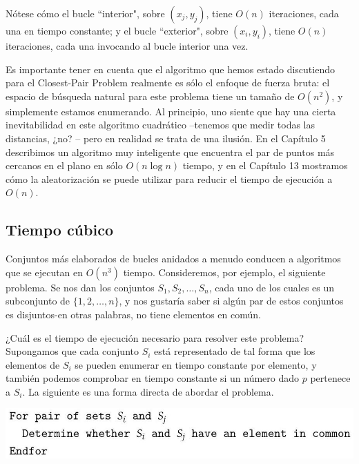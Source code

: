 \documentclass[a4paper, 12pt]{book}
\theoremstyle{dotless}
\begin{document}
Nótese cómo el bucle ``interior", sobre $\left(x_{j}, y_{j}\right)$, tiene $O(n)$ iteraciones, cada una en tiempo constante; y el bucle ``exterior", sobre $\left(x_{i}, y_{i}\right)$, tiene $O(n)$ iteraciones, cada una invocando al bucle interior una vez.

Es importante tener en cuenta que el algoritmo que hemos estado discutiendo para el Closest-Pair Problem realmente es sólo el enfoque de fuerza bruta: el espacio de búsqueda natural para este problema tiene un tamaño de $O\left(n^{2}\right)$, y simplemente estamos enumerando. Al principio, uno siente que hay una cierta inevitabilidad en este algoritmo cuadrático --tenemos que medir todas las distancias, ¿no? -- pero en realidad se trata de una ilusión. En el Capítulo 5 describimos un algoritmo muy inteligente que encuentra el par de puntos más cercanos en el plano en sólo $O(n \log n)$ tiempo, y en el Capítulo 13 mostramos cómo la aleatorización se puede utilizar para reducir el tiempo de ejecución a $O(n)$.

\subsection*{Tiempo cúbico}

Conjuntos más elaborados de bucles anidados a menudo conducen a algoritmos que se ejecutan en $O\left(n^{3}\right)$ tiempo. Consideremos, por ejemplo, el siguiente problema. Se nos dan los conjuntos $S_{1}, S_{2}, \ldots, S_{n}$, cada uno de los cuales es un subconjunto de $\{1,2, \ldots, n\}$, y nos gustaría saber si algún par de estos conjuntos es disjuntos-en otras palabras, no tiene elementos en común.

¿Cuál es el tiempo de ejecución necesario para resolver este problema? Supongamos que cada conjunto $S_{i}$ está representado de tal forma que los elementos de $S_{i}$ se pueden enumerar en tiempo constante por elemento, y también podemos comprobar en tiempo constante si un número dado $p$ pertenece a $S_{i}$. La siguiente es una forma directa de abordar el problema.

\begin{center}
\includegraphics[width=\textwidth]{./Imagenes-Seccion2/2023_08_07_379b6f7f3185549667e3g-06}
\end{center}
\end{document}
